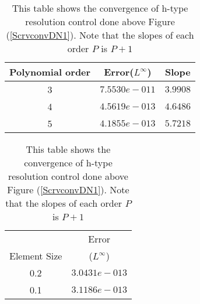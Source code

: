 \begin{table}[h]
\centering \caption{\label{hconv2t1} This table shows the
convergence of h-type resolution control done above Figure
(\ref{ScrvconvDN1}). Note that the slopes of each order $P$ is
$P+1$ }
\begin{tabular}{|c|c|c|} \hline
    Polynomial order&Error($L^{\infty}$)&Slope   \\ \hline \hline
    3&$7.5530e-011$ &$3.9908$ \\ \hline
    4&$4.5619e-013$ &$4.6486$ \\ \hline
    5&$4.1855e-013$ &$5.7218$ \\ \hline
\end{tabular}
\hspace{.5in}
\begin{tabular}{|c|c|} \hline
    &\multicolumn{1}{|c|}{Error}\\
    \raisebox{0.5\baselineskip}%
    {Element Size}&($L^{\infty}$) \\ \hline \hline
    0.2&$3.0431e-013$  \\ \hline
    0.1&$3.1186e-013$ \\ \hline
\end{tabular}
\end{table}
